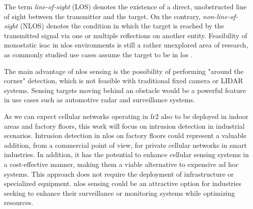 	The term \textit{line-of-sight} (LOS)  denotes the existence of a direct, unobstructed line of sight between the transmitter and the target. On the contrary, \textit{non-line-of-sight} (NLOS) denotes the condition in which the target is reached by the transmitted signal via one or multiple reflections on another entity. 
	Feasibility of monostatic \gls{isac} in \gls{nlos} environments is still a rather unexplored area of research, as commonly studied use cases assume the target to be in \gls{los} \cite{Gustaffson_NLOS_radar}.
	
	The main advantage of \gls{nlos} sensing is the possibility of performing "around the corner" detection, which is not feasible with traditional fixed camera or LIDAR systems. 
	Sensing targets moving behind an obstacle would be a powerful feature in use cases such as automotive radar and surveillance systems.
	
	As we can expect cellular networks operating in \gls{fr2} also to be deployed in indoor areas and factory floors, this work will focus on intrusion detection in industrial scenarios.
	Intrusion detection in \gls{nlos} on factory floors could represent a valuable addition, from a commercial point of view, for private cellular networks in smart industries.
	In addition, it has the potential to enhance cellular sensing systems in a cost-effective manner, making them a viable alternative to expensive ad hoc systems. This approach does not require the deployment of infrastructure or specialized equipment. 
	\gls{nlos} sensing could be an attractive option for industries seeking to enhance their surveillance or monitoring systems while optimizing resources.
	
	
	

